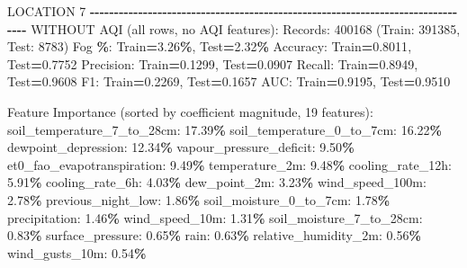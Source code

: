 \documentclass[
  letterpaper,
  DIV=11,
  numbers=noendperiod]{scrartcl}
\newenvironment{Shaded}{\begin{snugshade}}{\end{snugshade}}
\newcommand{\BuiltInTok}[1]{#1}
\newcommand{\DecValTok}[1]{\textcolor[rgb]{0.00,0.00,0.81}{#1}}
\newcommand{\FloatTok}[1]{\textcolor[rgb]{0.00,0.00,0.81}{#1}}
\newcommand{\NormalTok}[1]{#1}
\newcommand{\OperatorTok}[1]{\textcolor[rgb]{0.81,0.36,0.00}{\textbf{#1}}}
\begin{document}
\begin{Shaded}
\begin{Highlighting}[]
\NormalTok{LOCATION }\DecValTok{7}
\OperatorTok{{-}{-}{-}{-}{-}{-}{-}{-}{-}{-}{-}{-}{-}{-}{-}{-}{-}{-}{-}{-}{-}{-}{-}{-}{-}{-}{-}{-}{-}{-}{-}{-}{-}{-}{-}{-}{-}{-}{-}{-}{-}{-}{-}{-}{-}{-}{-}{-}{-}{-}{-}{-}{-}{-}{-}{-}{-}{-}{-}{-}{-}{-}{-}{-}{-}{-}{-}{-}{-}{-}{-}{-}{-}{-}{-}{-}{-}{-}{-}{-}}
\NormalTok{WITHOUT AQI (}\BuiltInTok{all}\NormalTok{ rows, no AQI features):}
\NormalTok{  Records: }\DecValTok{400168}\NormalTok{ (Train: }\DecValTok{391385}\NormalTok{, Test: }\DecValTok{8783}\NormalTok{)}
\NormalTok{  Fog }\OperatorTok{\%}\NormalTok{: Train}\OperatorTok{=}\FloatTok{3.26}\OperatorTok{\%}\NormalTok{, Test}\OperatorTok{=}\FloatTok{2.32}\OperatorTok{\%}
\NormalTok{  Accuracy: Train}\OperatorTok{=}\FloatTok{0.8011}\NormalTok{, Test}\OperatorTok{=}\FloatTok{0.7752}
\NormalTok{  Precision: Train}\OperatorTok{=}\FloatTok{0.1299}\NormalTok{, Test}\OperatorTok{=}\FloatTok{0.0907}
\NormalTok{  Recall: Train}\OperatorTok{=}\FloatTok{0.8949}\NormalTok{, Test}\OperatorTok{=}\FloatTok{0.9608}
\NormalTok{  F1: Train}\OperatorTok{=}\FloatTok{0.2269}\NormalTok{, Test}\OperatorTok{=}\FloatTok{0.1657}
\NormalTok{  AUC: Train}\OperatorTok{=}\FloatTok{0.9195}\NormalTok{, Test}\OperatorTok{=}\FloatTok{0.9510}

\NormalTok{  Feature Importance (}\BuiltInTok{sorted}\NormalTok{ by coefficient magnitude, }\DecValTok{19}\NormalTok{ features):}
\NormalTok{    soil\_temperature\_7\_to\_28cm: }\FloatTok{17.39}\OperatorTok{\%}
\NormalTok{    soil\_temperature\_0\_to\_7cm: }\FloatTok{16.22}\OperatorTok{\%}
\NormalTok{    dewpoint\_depression: }\FloatTok{12.34}\OperatorTok{\%}
\NormalTok{    vapour\_pressure\_deficit: }\FloatTok{9.50}\OperatorTok{\%}
\NormalTok{    et0\_fao\_evapotranspiration: }\FloatTok{9.49}\OperatorTok{\%}
\NormalTok{    temperature\_2m: }\FloatTok{9.48}\OperatorTok{\%}
\NormalTok{    cooling\_rate\_12h: }\FloatTok{5.91}\OperatorTok{\%}
\NormalTok{    cooling\_rate\_6h: }\FloatTok{4.03}\OperatorTok{\%}
\NormalTok{    dew\_point\_2m: }\FloatTok{3.23}\OperatorTok{\%}
\NormalTok{    wind\_speed\_100m: }\FloatTok{2.78}\OperatorTok{\%}
\NormalTok{    previous\_night\_low: }\FloatTok{1.86}\OperatorTok{\%}
\NormalTok{    soil\_moisture\_0\_to\_7cm: }\FloatTok{1.78}\OperatorTok{\%}
\NormalTok{    precipitation: }\FloatTok{1.46}\OperatorTok{\%}
\NormalTok{    wind\_speed\_10m: }\FloatTok{1.31}\OperatorTok{\%}
\NormalTok{    soil\_moisture\_7\_to\_28cm: }\FloatTok{0.83}\OperatorTok{\%}
\NormalTok{    surface\_pressure: }\FloatTok{0.65}\OperatorTok{\%}
\NormalTok{    rain: }\FloatTok{0.63}\OperatorTok{\%}
\NormalTok{    relative\_humidity\_2m: }\FloatTok{0.56}\OperatorTok{\%}
\NormalTok{    wind\_gusts\_10m: }\FloatTok{0.54}\OperatorTok{\%}


\end{Highlighting}
\end{Shaded}
\end{document}
